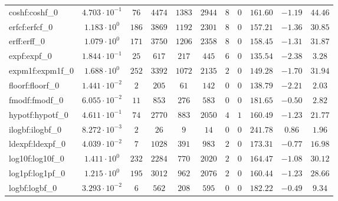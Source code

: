 \begin{tabular}{|l|c|c|c|c|c|c|c|c|c|c|}
coshf:coshf\_0               & $ 4.703 \cdot 10^{-1} $ & $ 76     $ & $ 4474  $ & $ 1383  $ & $ 2944  $ & $ 8   $ & $ 0 $ & $ 161.60      $ & $ -1.19   $ & $ 44.46   $ \\
erfcf:erfcf\_0               & $ 1.183 \cdot 10^{0}  $ & $ 186    $ & $ 3869  $ & $ 1192  $ & $ 2301  $ & $ 8   $ & $ 0 $ & $ 157.21      $ & $ -1.36   $ & $ 30.85   $ \\
erff:erff\_0                 & $ 1.079 \cdot 10^{0}  $ & $ 171    $ & $ 3750  $ & $ 1206  $ & $ 2358  $ & $ 8   $ & $ 0 $ & $ 158.45      $ & $ -1.31   $ & $ 31.87   $ \\
expf:expf\_0                 & $ 1.844 \cdot 10^{-1} $ & $ 25     $ & $ 617   $ & $ 217   $ & $ 445   $ & $ 6   $ & $ 0 $ & $ 135.54      $ & $ -2.38   $ & $ 3.28    $ \\
expm1f:expm1f\_0             & $ 1.688 \cdot 10^{0}  $ & $ 252    $ & $ 3392  $ & $ 1072  $ & $ 2135  $ & $ 2   $ & $ 0 $ & $ 149.28      $ & $ -1.70   $ & $ 31.94   $ \\
floorf:floorf\_0             & $ 1.441 \cdot 10^{-2} $ & $ 2      $ & $ 205   $ & $ 61    $ & $ 142   $ & $ 0   $ & $ 0 $ & $ 138.79      $ & $ -2.21   $ & $ 2.03    $ \\
fmodf:fmodf\_0               & $ 6.055 \cdot 10^{-2} $ & $ 11     $ & $ 853   $ & $ 276   $ & $ 583   $ & $ 0   $ & $ 0 $ & $ 181.65      $ & $ -0.50   $ & $ 2.82    $ \\
hypotf:hypotf\_0             & $ 4.611 \cdot 10^{-1} $ & $ 74     $ & $ 2770  $ & $ 883   $ & $ 2050  $ & $ 4   $ & $ 1 $ & $ 160.49      $ & $ -1.23   $ & $ 21.77   $ \\
ilogbf:ilogbf\_0             & $ 8.272 \cdot 10^{-3} $ & $ 2      $ & $ 26    $ & $ 9     $ & $ 14    $ & $ 0   $ & $ 0 $ & $ 241.78      $ & $ 0.86    $ & $ 1.96    $ \\
ldexpf:ldexpf\_0             & $ 4.039 \cdot 10^{-2} $ & $ 7      $ & $ 1028  $ & $ 391   $ & $ 983   $ & $ 2   $ & $ 0 $ & $ 173.31      $ & $ -0.77   $ & $ 16.98   $ \\
log10f:log10f\_0             & $ 1.411 \cdot 10^{0}  $ & $ 232    $ & $ 2284  $ & $ 770   $ & $ 2020  $ & $ 2   $ & $ 0 $ & $ 164.47      $ & $ -1.08   $ & $ 30.12   $ \\
log1pf:log1pf\_0             & $ 1.215 \cdot 10^{0}  $ & $ 195    $ & $ 3012  $ & $ 962   $ & $ 2076  $ & $ 2   $ & $ 0 $ & $ 160.44      $ & $ -1.23   $ & $ 28.66   $ \\
logbf:logbf\_0               & $ 3.293 \cdot 10^{-2} $ & $ 6      $ & $ 562   $ & $ 208   $ & $ 595   $ & $ 0   $ & $ 0 $ & $ 182.22      $ & $ -0.49   $ & $ 9.34    $ \\

\end{tabular}
